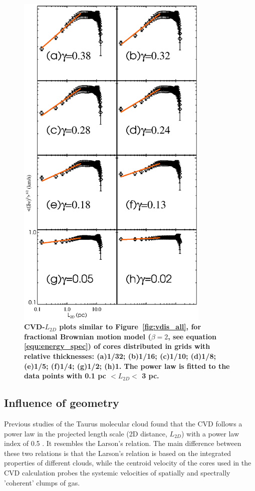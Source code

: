 \documentclass[iop,revtex4]{emulateapj}
\begin{document}
\begin{figure}[htbp]
\begin{minipage}[b]{0.45\textwidth}
  \includegraphics[width=9.2cm]{vdisfft_errorbar2_all.eps}
\end{minipage}
\caption{\bf CVD-$L_{2D}$ plots similar to Figure~\ref{fig:vdis_all}, for fractional Brownian motion model ($\beta=2$, see equation \ref{equ:energy_spec}) of cores distributed in grids with relative thicknesses: (a)1/32; (b)1/16; (c)1/10; (d)1/8; (e)1/5; (f)1/4; (g)1/2; (h)1. The power law is fitted to the data points with 0.1 pc $<L_{2D}<$ 3 pc. }\label{fig:vdis_fft_errorbar}
\end{figure}


\subsection{Influence of geometry}


Previous studies of the Taurus molecular cloud found that the CVD follows a power law in the projected length scale (2D distance, $L_{2D}$) with a power law index of 0.5 \citep{Qian2012}. It resembles the Larson's relation. The main difference between these two relations is that the Larson's relation is based on the integrated properties of different clouds, while the centroid velocity of the cores used in the CVD calculation probes the systemic velocities of spatially and spectrally 'coherent' clumps of gas.
\end{document}
